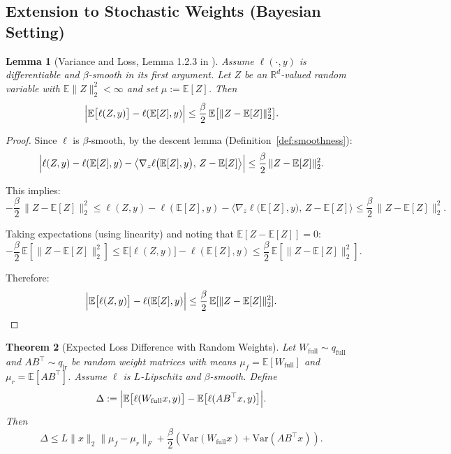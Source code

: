 \documentclass{article}
\theoremstyle{plain}
\newtheorem{theorem}{Theorem}[section]
\newtheorem{lemma}[theorem]{Lemma}
\theoremstyle{definition}
\theoremstyle{remark}
\begin{document}
\subsection{Extension to Stochastic Weights (Bayesian Setting)}\label{app:stochastic_loss}

\begin{lemma}[Variance and Loss, Lemma 1.2.3 in \cite{nesterov2018lectures}]
\label{lem:variance_loss}
Assume $\ell(\cdot,y)$ is differentiable and $\beta$-smooth in its first argument. Let $Z$ be an $\mathbb{R}^d$-valued random variable with $\mathbb{E}\|Z\|_2^2<\infty$ and set $\mu:=\mathbb{E}[Z]$. Then
\[
\Bigl|\mathbb{E}\bigl[\ell(Z,y)\bigr]-\ell(\mathbb{E}[Z],y)\Bigr|
\le \frac{\beta}{2}\,\mathbb{E}\bigl[\|Z-\mathbb{E}[Z]\|_2^2\bigr].
\]
\end{lemma}

\begin{proof}
Since $\ell$ is $\beta$-smooth, by the descent lemma (Definition~\ref{def:smoothness}):
\[
\Bigl|
\ell(Z,y)-\ell(\mathbb{E}[Z],y)
-\bigl\langle \nabla_z \ell\bigl(\mathbb{E}[Z],y\bigr),\, Z-\mathbb{E}[Z]\bigr\rangle
\Bigr|
\le \frac{\beta}{2}\,\|Z-\mathbb{E}[Z]\|_2^{2}.
\]

This implies:
\[
-\frac{\beta}{2}\,\|Z-\mathbb{E}[Z]\|_2^{2}
\le
\ell(Z,y)-\ell(\mathbb{E}[Z],y)
-\bigl\langle \nabla_z \ell\bigl(\mathbb{E}[Z],y\bigr),\, Z-\mathbb{E}[Z]\bigr\rangle
\le
\frac{\beta}{2}\,\|Z-\mathbb{E}[Z]\|_2^{2}.
\]

Taking expectations (using linearity) and noting that $\mathbb{E}[Z-\mathbb{E}[Z]]=0$:
\[
-\frac{\beta}{2}\,\mathbb{E}[\|Z-\mathbb{E}[Z]\|_2^{2}]
\le
\mathbb{E}\bigl[\ell(Z,y)\bigr]-\ell(\mathbb{E}[Z],y)
\le
\frac{\beta}{2}\,\mathbb{E}[\|Z-\mathbb{E}[Z]\|_2^{2}].
\]

Therefore:
\[
\Bigl|\mathbb{E}\bigl[\ell(Z,y)\bigr]-\ell(\mathbb{E}[Z],y)\Bigr|
\le
\frac{\beta}{2}\,\mathbb{E}[\|Z-\mathbb{E}[Z]\|_2^{2}].
\]
\end{proof}

\begin{theorem}[Expected Loss Difference with Random Weights]
\label{thm:stochastic_loss}
Let $W_{\mathrm{full}} \sim q_{\mathrm{full}}$ and $AB^\top \sim q_{\mathrm{lr}}$ be random weight matrices with means $\mu_f = \mathbb{E}[W_{\mathrm{full}}]$ and $\mu_r = \mathbb{E}[AB^\top]$. Assume $\ell$ is $L$-Lipschitz and $\beta$-smooth. Define
\[
\Delta := \Bigl|\mathbb{E}\bigl[\ell(W_{\mathrm{full}}x, y)\bigr] 
- \mathbb{E}\bigl[\ell(AB^\top x, y)\bigr]\Bigr|.
\]
Then
\[
\Delta \leq L\|x\|_2 \|\mu_f - \mu_r\|_F 
+ \frac{\beta}{2}\left(\mathrm{Var}(W_{\mathrm{full}}x) + \mathrm{Var}(AB^\top x)\right).
\]
\end{theorem}
\end{document}
